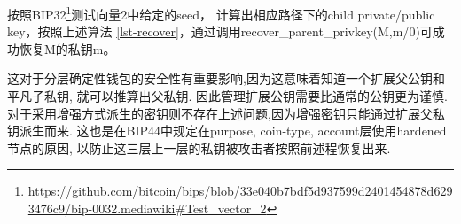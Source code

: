 按照BIP32\footnote{\url{https://github.com/bitcoin/bips/blob/33e040b7bdf5d937599d2401454878d6293476c9/bip-0032.mediawiki\#Test_vector_2}}测试向量2中给定的seed，
计算出相应路径下的child private/public key，按照上述算法
\ref{lst-recover}，通过调用recover_parent_privkey(M,m/0)可成功恢复M的私钥m。

这对于分层确定性钱包的安全性有重要影响,因为这意味着知道一个扩展父公钥和平凡子私钥,
就可以推算出父私钥. 因此管理扩展公钥需要比通常的公钥更为谨慎.
对于采用增强方式派生的密钥则不存在上述问题,因为增强密钥只能通过扩展父私钥派生而来.
这也是在BIP44中规定在purpose, coin-type, account层使用hardened 节点的原因,
以防止这三层上一层的私钥被攻击者按照前述程恢复出来.



